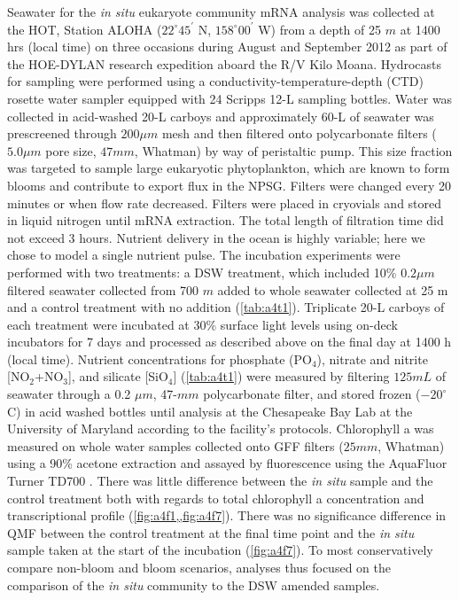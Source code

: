 Seawater for the \textit{in situ} eukaryote community mRNA analysis was collected at the HOT, Station ALOHA ($22^\circ 45^\prime$ N, $158^\circ 00^\prime$ W) from a depth of 25 $m$ at 1400 hrs (local time) on three occasions during August and September 2012 as part of the HOE-DYLAN research expedition aboard the R/V Kilo Moana. Hydrocasts for sampling were performed using a conductivity-temperature-depth (CTD) rosette water sampler equipped with 24 Scripps 12-L sampling bottles. Water was collected in acid-washed 20-L carboys and approximately 60-L of seawater was prescreened through $200 \mu m$ mesh and then filtered onto polycarbonate filters ($5.0 \mu m$ pore size, $47 mm$, Whatman) by way of peristaltic pump. This size fraction was targeted to sample large eukaryotic phytoplankton, which are known to form blooms and contribute to export flux in the NPSG. Filters were changed every 20 minutes or when flow rate decreased. Filters were placed in cryovials and stored in liquid nitrogen until mRNA extraction. The total length of filtration time did not exceed 3 hours. Nutrient delivery in the ocean is highly variable; here we chose to model a single nutrient pulse. The incubation experiments were performed with two treatments: a DSW treatment, which included 10\% $0.2 \mu m$ filtered seawater collected from 700 $m$ added to whole seawater collected at 25 m and a control treatment with no addition (\cref{tab:a4t1}). Triplicate 20-L carboys of each treatment were incubated at 30\% surface light levels using on-deck incubators for 7 days and processed as described above on the final day at 1400 h (local time). Nutrient concentrations for phosphate (PO$_4$), nitrate and nitrite [NO$_2$+NO$_3$], and silicate [SiO$_4$] (\cref{tab:a4t1}) were measured by filtering $125mL$ of seawater through a 0.2 $\mu m$, 47-$mm$ polycarbonate filter, and stored frozen ($−20^\circ$C) in acid washed bottles until analysis at the Chesapeake Bay Lab at the University of Maryland according to the facility's protocols. Chlorophyll a was measured on whole water samples collected onto GF\/F filters ($25 mm$, Whatman) using a 90\% acetone extraction and assayed by fluorescence using the AquaFluor Turner TD700 \citep{Parsons1984}. There was little difference between the \textit{in situ} sample and the control treatment both with regards to total chlorophyll a concentration and transcriptional profile (\cref{fig:a4f1,,fig:a4f7}).  There was no significance difference in QMF between the control treatment at the final time point and the \textit{in situ} sample taken at the start of the incubation (\cref{fig:a4f7}). To most conservatively compare non-bloom and bloom scenarios, analyses thus focused on the comparison of the \textit{in situ} community to the DSW amended samples. \par

